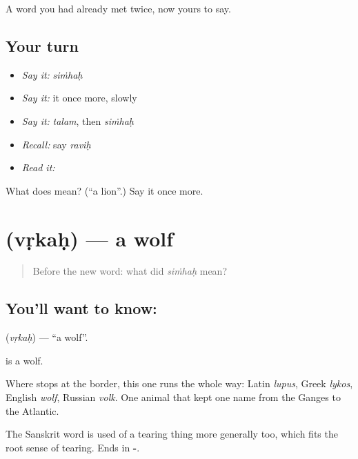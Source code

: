 \begin{grammarlens}[title={What you've built}]
A word you had already met twice, now yours to say.
\end{grammarlens}

\subsection*{Your turn}
\begin{itemize}
\raggedright
  \item \emph{Say it:} \emph{siṁhaḥ}
  \item \emph{Say it:} it once more, slowly
  \item \emph{Say it:} \emph{talam}, then \emph{siṁhaḥ}
  \item \emph{Recall:} say \emph{raviḥ}
  \item \emph{Read it:} \textbf{}
\end{itemize}

\begin{tcolorbox}[breakable,colback=teal!4,colframe=teal!35!black,title={Before you move on}]
What does  mean? (\textquotedblleft{}a lion\textquotedblright{}.) Say it once more.
\end{tcolorbox}
\section[\texorpdfstring{\sk{वृकः} (vṛkaḥ)}{वृकः (vṛkaḥ)}]{ (vṛkaḥ) — a wolf}

\label{lesson:SA-C48-wolf}



\begin{quote}
Before the new word: what did \emph{siṁhaḥ} mean?
\end{quote}

\subsection*{You'll want to know: }
\textbf{} (\emph{vṛkaḥ}) — \textquotedblleft{}a wolf\textquotedblright{}.

\textbf{} is a wolf.

Where  stops at the border, this one runs the whole way: Latin \emph{lupus}, Greek \emph{lykos}, English \emph{wolf}, Russian \emph{volk}. One animal that kept one name from the Ganges to the Atlantic.

The Sanskrit word is used of a tearing thing more generally too, which fits the root sense of tearing. Ends in \textbf{-}.

